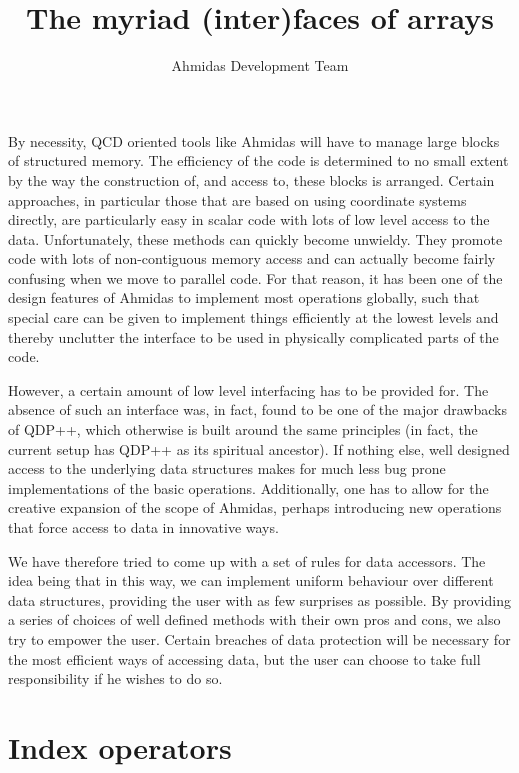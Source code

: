 \documentclass[a4paper,12pt,twoside]{article}
\author{Ahmidas Development Team}
\title{The myriad (inter)faces of arrays}
\begin{document}
\maketitle

By necessity, QCD oriented tools like Ahmidas will have to manage large blocks of structured memory. The efficiency of the code is determined to no small extent by the way the construction of, and access to, these blocks is arranged. Certain approaches, in particular those that are based on using coordinate systems directly, are particularly easy in scalar code with lots of low level access to the data. Unfortunately, these methods can quickly become unwieldy. They promote code with lots of non-contiguous memory access and can actually become fairly confusing when we move to parallel code. For that reason, it has been one of the design features of Ahmidas to implement most operations globally, such that special care can be given to implement things efficiently at the lowest levels and thereby unclutter the interface to be used in physically complicated parts of the code.

However, a certain amount of low level interfacing has to be provided for. The absence of such an interface was, in fact, found to be one of the major drawbacks of QDP++, which otherwise is built around the same principles (in fact, the current setup has QDP++ as its spiritual ancestor). If nothing else, well designed access to the underlying data structures makes for much less bug prone implementations of the basic operations. Additionally, one has to allow for the creative expansion of the scope of Ahmidas, perhaps introducing new operations that force access to data in innovative ways.

We have therefore tried to come up with a set of rules for data accessors. The idea being that in this way, we can implement uniform behaviour over different data structures, providing the user with as few surprises as possible. By providing a series of choices of well defined methods with their own pros and cons, we also try to empower the user. Certain breaches of data protection will be necessary for the most efficient ways of accessing data, but the user can choose to take full responsibility if he wishes to do so.

\section{Index operators}
\end{document}
